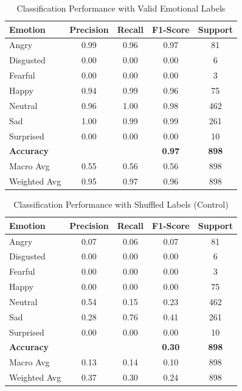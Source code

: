 \documentclass{article}
\begin{document}
\begin{table}[H]
\centering
\caption{Classification Performance with Valid Emotional Labels}
\label{tab:valid_results}
\begin{tabular}{@{}lcccc@{}}
\toprule
\textbf{Emotion} & \textbf{Precision} & \textbf{Recall} & \textbf{F1-Score} & \textbf{Support} \\
\midrule
Angry & 0.99 & 0.96 & 0.97 & 81 \\
Disgusted & 0.00 & 0.00 & 0.00 & 6 \\
Fearful & 0.00 & 0.00 & 0.00 & 3 \\
Happy & 0.94 & 0.99 & 0.96 & 75 \\
Neutral & 0.96 & 1.00 & 0.98 & 462 \\
Sad & 1.00 & 0.99 & 0.99 & 261 \\
Surprised & 0.00 & 0.00 & 0.00 & 10 \\
\midrule
\textbf{Accuracy} & & & \textbf{0.97} & \textbf{898} \\
Macro Avg & 0.55 & 0.56 & 0.56 & 898 \\
Weighted Avg & 0.95 & 0.97 & 0.96 & 898 \\
\bottomrule
\end{tabular}
\end{table}

\begin{table}[H]
\centering
\caption{Classification Performance with Shuffled Labels (Control)}
\label{tab:shuffled_results}
\begin{tabular}{@{}lcccc@{}}
\toprule
\textbf{Emotion} & \textbf{Precision} & \textbf{Recall} & \textbf{F1-Score} & \textbf{Support} \\
\midrule
Angry & 0.07 & 0.06 & 0.07 & 81 \\
Disgusted & 0.00 & 0.00 & 0.00 & 6 \\
Fearful & 0.00 & 0.00 & 0.00 & 3 \\
Happy & 0.00 & 0.00 & 0.00 & 75 \\
Neutral & 0.54 & 0.15 & 0.23 & 462 \\
Sad & 0.28 & 0.76 & 0.41 & 261 \\
Surprised & 0.00 & 0.00 & 0.00 & 10 \\
\midrule
\textbf{Accuracy} & & & \textbf{0.30} & \textbf{898} \\
Macro Avg & 0.13 & 0.14 & 0.10 & 898 \\
Weighted Avg & 0.37 & 0.30 & 0.24 & 898 \\
\bottomrule
\end{tabular}
\end{table}
\end{document}
